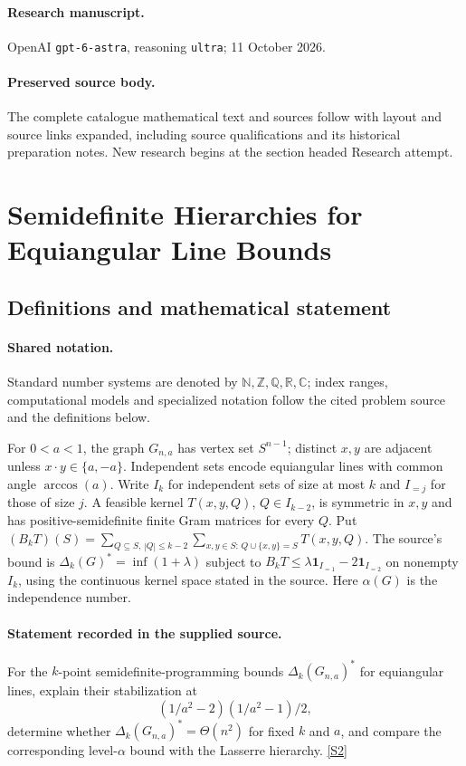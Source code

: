 \documentclass[11pt]{article}
\begin{document}
\paragraph{Research manuscript.} OpenAI \texttt{gpt-6-astra}, reasoning \texttt{ultra}; 11 October 2026.
\paragraph{Preserved source body.} The complete catalogue mathematical text and sources follow with layout and source links expanded, including source qualifications and its historical preparation notes. New research begins at the section headed Research attempt.

\section{Semidefinite Hierarchies for Equiangular Line Bounds}\label{statement}

\subsection{Definitions and mathematical statement}

\paragraph{Shared notation.}Standard number systems are denoted by $\mathbb N,\mathbb Z,\mathbb Q,\mathbb R,\mathbb C$; index ranges, computational models and specialized notation follow the cited problem source and the definitions below.


For $0<a<1$, the graph $G_{n,a}$ has vertex set $S^{n-1}$; distinct $x,y$ are adjacent unless $x\cdot y\in\{a,-a\}$. Independent sets encode equiangular lines with common angle $\arccos(a)$. Write $I_k$ for independent sets of size at most $k$ and $I_{=j}$ for those of size $j$. A feasible kernel $T(x,y,Q)$, $Q\in I_{k-2}$, is symmetric in $x,y$ and has positive-semidefinite finite Gram matrices for every $Q$. Put $(B_kT)(S)=\sum_{Q\subseteq S,\,|Q|\leq k-2}\sum_{x,y\in S:\,Q\cup\{x,y\}=S}T(x,y,Q)$. The source's bound is $\Delta_k(G)^*=\inf(1+\lambda)$ subject to $B_kT\leq\lambda\mathbf1_{I_{=1}}-2\mathbf1_{I_{=2}}$ on nonempty $I_k$, using the continuous kernel space stated in the source. Here $\alpha(G)$ is the independence number.
\paragraph{Statement recorded in the supplied source.}
For the $k$-point semidefinite-programming bounds $\Delta_k(G_{n,a})^*$ for equiangular lines, explain their stabilization at $$(1/a^2-2)(1/a^2-1)/2,$$ determine whether $\Delta_k(G_{n,a})^*=\Theta(n^2)$ for fixed $k$ and $a$, and compare the corresponding level-$\alpha$ bound with the Lasserre hierarchy. \href{https://doi.org/10.4171/owr/2019/26}{[S2]}
\end{document}
